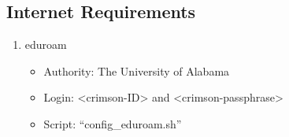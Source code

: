 	\subsection{Internet Requirements}	\label{subsec:internet}
		\begin{enumerate}
			\item eduroam
				\begin{itemize}
					\item Authority: The University of Alabama
					\item  Login: <crimson-ID> and <crimson-passphrase>
					\item Script: ``config\_eduroam.sh''
				\end{itemize}
		\end{enumerate}
